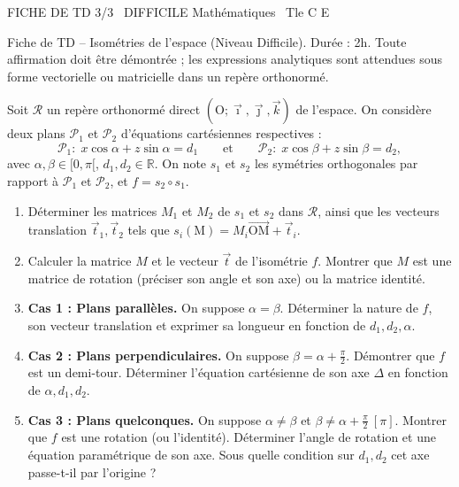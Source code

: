 \documentclass[11pt]{article}
\begin{document}
\begin{tcolorbox}[enhanced,colback=popink,colframe=popink,arc=10pt,boxrule=0pt,left=12pt,right=12pt,top=9pt,bottom=9pt]
{\color{white}\popxbold\small FICHE DE TD 3/3 \textbullet\ DIFFICILE \hfill Mathématiques \textbullet\ Tle C E\par}
\end{tcolorbox}
\vspace{4pt}
Fiche de TD – Isométries de l'espace (Niveau Difficile). Durée : 2h. Toute affirmation doit être démontrée ; les expressions analytiques sont attendues sous forme vectorielle ou matricielle dans un repère orthonormé.

\begin{exercice}
Soit $\mathcal{R}$ un repère orthonormé direct $(\mathrm{O};\vec{\imath},\vec{\jmath},\vec{k})$ de l'espace. On considère deux plans $\mathscr{P}_1$ et $\mathscr{P}_2$ d'équations cartésiennes respectives :
\[
\mathscr{P}_1:\; x\cos\alpha + z\sin\alpha = d_1 \qquad\text{et}\qquad \mathscr{P}_2:\; x\cos\beta + z\sin\beta = d_2,
\]
avec $\alpha,\beta \in [0,\pi[$, $d_1,d_2 \in \mathbb{R}$. On note $s_1$ et $s_2$ les symétries orthogonales par rapport à $\mathscr{P}_1$ et $\mathscr{P}_2$, et $f = s_2 \circ s_1$.

\begin{enumerate}
    \item Déterminer les matrices $M_1$ et $M_2$ de $s_1$ et $s_2$ dans $\mathcal{R}$, ainsi que les vecteurs translation $\vec{t}_1,\vec{t}_2$ tels que $s_i(\mathrm{M}) = M_i\overrightarrow{\mathrm{OM}} + \vec{t}_i$.
    \item Calculer la matrice $M$ et le vecteur $\vec{t}$ de l'isométrie $f$. Montrer que $M$ est une matrice de rotation (préciser son angle et son axe) ou la matrice identité.
    \item \textbf{Cas 1 : Plans parallèles.} On suppose $\alpha = \beta$. Déterminer la nature de $f$, son vecteur translation et exprimer sa longueur en fonction de $d_1,d_2,\alpha$.
    \item \textbf{Cas 2 : Plans perpendiculaires.} On suppose $\beta = \alpha + \frac{\pi}{2}$. Démontrer que $f$ est un demi-tour. Déterminer l'équation cartésienne de son axe $\Delta$ en fonction de $\alpha,d_1,d_2$.
    \item \textbf{Cas 3 : Plans quelconques.} On suppose $\alpha \neq \beta$ et $\beta \neq \alpha + \frac{\pi}{2}\ [\pi]$. Montrer que $f$ est une rotation (ou l'identité). Déterminer l'angle de rotation et une équation paramétrique de son axe. Sous quelle condition sur $d_1,d_2$ cet axe passe-t-il par l'origine ?
\end{enumerate}
\end{exercice}
\end{document}
